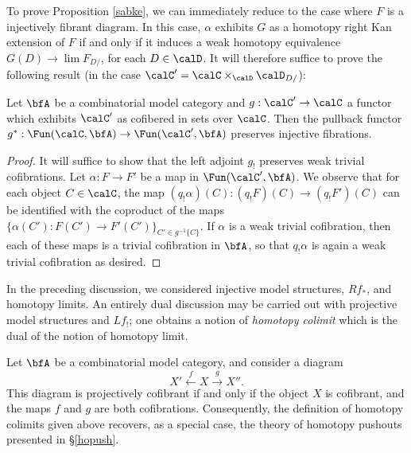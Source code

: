 To prove Proposition \ref{sabke}, we can immediately reduce to the case where
$F$ is a injectively fibrant diagram. In this case, $\alpha$ exhibits $G$ as a homotopy
right Kan extension of $F$ if and only if it induces a weak homotopy equivalence
$G(D) \rightarrow \lim F_{D/}$, for each $D \in \calD$. It will therefore suffice to prove the following result
(in the case $\calC' = \calC \times_{\calD} \calD_{D/}$):

\begin{lemma}\label{sumtuous}
Let $\bfA$ be a combinatorial model category and $g: \calC' \rightarrow \calC$
a functor which exhibits $\calC'$ as cofibered in sets over $\calC$.
Then the pullback functor $g^{\ast}: \Fun(\calC, \bfA) \rightarrow \Fun( \calC', \bfA)$
preserves injective fibrations.
\end{lemma}

\begin{proof}
It will suffice to show that the left adjoint $g_{!}$ preserves weak trivial cofibrations. 
Let $\alpha: F \rightarrow F'$ be a map in $\Fun( \calC', \bfA)$.
We observe that for each object $C \in \calC$, the map 
$(q_{!} \alpha)(C): (q_{!} F)(C) \rightarrow (q_{!} F')(C)$ can be identified
with the coproduct of the maps $\{ \alpha(C'): F(C') \rightarrow F'(C') \}_{ C' \in g^{-1} \{C\} }$.
If $\alpha$ is a weak trivial cofibration, then each of these maps is a trivial cofibration in $\bfA$, so that
$q_{!} \alpha$ is again a weak trivial cofibration as desired.
\end{proof}

\begin{remark}
In the preceding discussion, we considered injective model structures,
$Rf_{\ast}$, and homotopy limits. An entirely dual discussion may
be carried out with projective model structures and $Lf_{!}$; one obtains a
notion of {\it homotopy colimit} which is the dual of the notion
of homotopy limit.
\end{remark}

\begin{example}
Let $\bfA$ be a combinatorial model category, and consider a diagram
$$ X' \stackrel{f}{\leftarrow} X \stackrel{g}{\rightarrow} X''.$$
This diagram is projectively cofibrant if and only if the object $X$ is cofibrant, and the maps
$f$ and $g$ are both cofibrations. Consequently, the definition of homotopy colimits given above recovers, as a special case, the theory of homotopy pushouts presented in \S \ref{hopush}.
\end{example}

